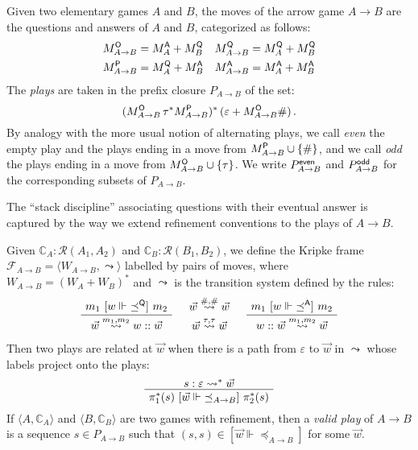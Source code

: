 \begin{definition} %
Given two elementary games $A$ and $B$,
the moves of the arrow game $A \rightarrow B$
are the questions and answers of $A$ and $B$,
categorized as follows:
\begin{align*}
  M_{A \rightarrow B}^{ \mathsf{O} } &= M_A^{ \mathsf{A} } + M_B^{ \mathsf{Q} } &
  M_{A \rightarrow B}^{ \mathsf{Q} } &= M_A^{ \mathsf{Q} } + M_B^{ \mathsf{Q} } \\
  M_{A \rightarrow B}^{ \mathsf{P} } &= M_A^{ \mathsf{Q} } + M_B^{ \mathsf{A} } &
  M_{A \rightarrow B}^{ \mathsf{A} } &= M_A^{ \mathsf{A} } + M_B^{ \mathsf{A} }
\end{align*}
The \emph{plays} are taken in
the prefix closure $P_{A \rightarrow B}$ of the set:
\[
    (M_{A \rightarrow B}^{ \mathsf{O} } \, \tau^*
     M_{A \rightarrow B}^{ \mathsf{P} })^* \,
    (\varepsilon + M_{A \rightarrow B}^{ \mathsf{O} } \#) \,.
\]
By analogy with the more usual notion of alternating plays,
we call \emph{even}
the empty play and the plays ending in
a move from $M_{A \rightarrow B}^{ \mathsf{P} } \cup \{\#\}$, and
we call \emph{odd} the plays ending in
a move from $M_{A \rightarrow B}^{ \mathsf{O} } \cup \{\tau\}$.
We write $P_{A \rightarrow B}^{ \mathsf{even} }$ and $P_{A \rightarrow B}^{ \mathsf{odd} }$
for the corresponding subsets of $P_{A \rightarrow B}$.
\end{definition}

The ``stack discipline'' associating questions
with their eventual answer is captured by
the way we extend refinement conventions to
the plays of $A \rightarrow B$.

\begin{definition} %
Given
$\mathbb{C}_A : \mathcal{R}(A_1, A_2)$ and
$\mathbb{C}_B : \mathcal{R}(B_1, B_2)$,
we define the Kripke frame
$\mathcal{F}_{A \rightarrow B} =
 \langle W_{A \rightarrow B}, \leadsto \rangle$
labelled by pairs of moves,
where $W_{A \rightarrow B} = (W_A + W_B)^*$
and $\leadsto$ is the transition system
defined by the rules:
\[
    \AxiomC{$m_1 \ifr{w \Vdash {\preceq}^\kw{Q}} m_2$}
    \UnaryInfC{$\vec{w} \stackrel{m_1, m_2}{\leadsto} w :: \vec{w}$}
    \DisplayProof
    \quad
    \begin{array}{c}
      \vec{w} \stackrel{\#,\#}{\leadsto} \vec{w} \\[0.7ex]
      \vec{w} \stackrel{\tau, \tau}{\leadsto} \vec{w}
    \end{array}
    \quad
    \AxiomC{$m_1 \ifr{w \Vdash {\preceq}^\kw{A}} m_2$}
    \UnaryInfC{$w :: \vec{w} \stackrel{m_1, m_2}{\leadsto} \vec{w}$}
    \DisplayProof
\]
Then two plays are related at $\vec{w}$
when there is a path from $\varepsilon$ to $\vec{w}$
in $\leadsto$ whose labels project onto the plays:
\[
    \AxiomC{$s : \varepsilon \leadsto^* \vec{w}$}
    \UnaryInfC{$\pi_1^*(s)
       \ifr{\vec{w} \Vdash {\preceq}_{A \rightarrow B}}
       \pi_2^*(s)$}
    \DisplayProof
\]
If
$\langle A, \mathbb{C}_A \rangle$ and
$\langle B, \mathbb{C}_B \rangle$
are two games with refinement, then
a \emph{valid play} of $A \rightarrow B$
is a sequence $s \in P_{A \rightarrow B}$
such that $(s, s) \in [\vec{w} \Vdash {\preceq}_{A \rightarrow B}]$
for some $\vec{w}$.
\end{definition}

